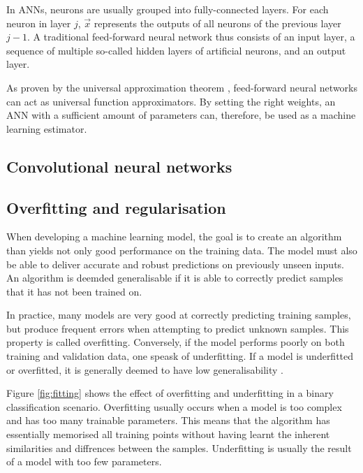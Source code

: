 \documentclass{l4proj}
\begin{document}
In ANNs, neurons are usually grouped into fully-connected layers. For each neuron in layer $j$, $\vec{x}$ represents the outputs of all neurons of the previous layer $j-1$. A traditional feed-forward neural network thus consists of an input layer, a sequence of multiple so-called hidden layers of artificial neurons, and an output layer.

As proven by the universal approximation theorem \citep{csaji_approximation_2001}, feed-forward neural networks can act as universal function approximators. By setting the right weights, an ANN with a sufficient amount of parameters can, therefore, be used as a machine learning estimator.




\subsection{Convolutional neural networks}

\subsection{Overfitting and regularisation}

When developing a machine learning model, the goal is to create an algorithm than yields not only good performance on the training data. The model must also be able to deliver accurate and robust predictions on previously unseen inputs. An algorithm is deemded generalisable if it is able to correctly predict samples that it has not been trained on. 

In practice, many models are very good at correctly predicting training samples, but produce frequent errors when attempting to predict unknown samples. This property is called overfitting. Conversely, if the model performs poorly on both training and validation data, one speask of underfitting. If a model is underfitted or overfitted, it is generally deemed to have low generalisability \citep{burkov_hundred-page_2019}. 

Figure \ref{fig:fitting} shows the effect of overfitting and underfitting in a binary classification scenario. Overfitting usually occurs when a model is too complex and has too many trainable parameters. This means that the algorithm has essentially memorised all training points without having learnt the inherent similarities and diffrences between the samples. Underfitting is usually the result of a model with too few parameters. 
\end{document}
